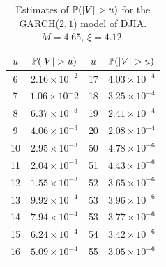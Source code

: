 \begin{table}[htb!]
  \centering
  \begin{tabular}{|c|c||c|c|}
    \hline \hline
    $u$ & $\P(|V| > u)$ &
    $u$ & $\P(|V| > u)$ \\
    \hline
    6 & $2.16 \times 10^{-2}$ &
    17 & $4.03 \times 10^{-4}$ \\
    7 & $1.06 \times 10^-2$ &
    18 & $3.25 \times 10^{-4}$ \\
    8 & $6.37 \times 10^{-3}$ &
    19 & $2.41 \times 10^{-4}$ \\
    9 & $4.06 \times 10^{-3}$ &
    20 & $2.08 \times 10^{-4}$ \\
    10 & $2.95 \times 10^{-3}$ &
    50 & $4.78 \times 10^{-6}$ \\
    11 & $2.04 \times 10^{-3}$ &
    51 & $4.43 \times 10^{-6}$ \\
    12 & $1.55 \times 10^{-3}$ &
    52 & $3.65 \times 10^{-6}$ \\
    13 & $9.92 \times 10^{-4}$ &
    53 & $3.96 \times 10^{-6}$ \\
    14 & $7.94 \times 10^{-4}$ &
    53 & $3.77 \times 10^{-6}$ \\
    15 & $6.24 \times 10^{-4}$ &
    54 & $3.42 \times 10^{-6}$ \\
    16 & $5.09 \times 10^{-4}$ &
    55 & $3.05 \times 10^{-6}$ \\
    \hline
  \end{tabular}
  \caption{
    Estimates of $\P(|V| > u)$ for the GARCH($2,1$) model of DJIA.
    $M = 4.65$, $\xi = 4.12$.
  }
  \label{tab:kpoktrg}
\end{table}
\clearpage
